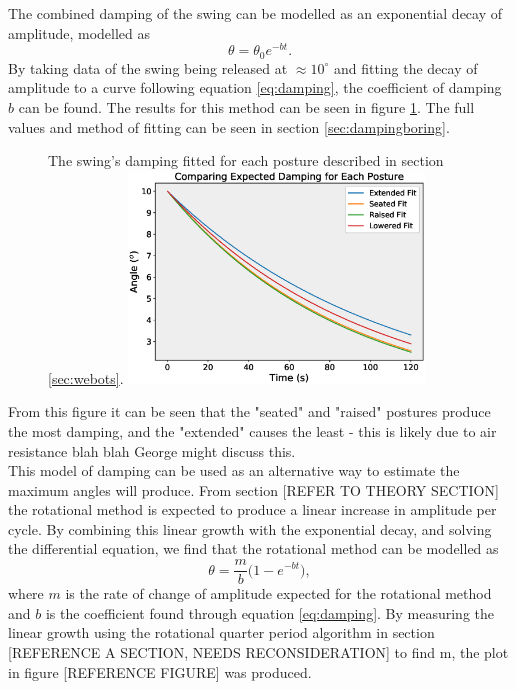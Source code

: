 \documentclass[11pt]{article}
\begin{document}
The combined damping of the swing can be modelled as an exponential decay of amplitude, modelled as 
\begin{equation} \label{eq:damping}
    \theta = \theta_0 e^{-bt}.
\end{equation}
By taking data of the swing being released at $\approx 10^\circ$ and fitting the decay of amplitude to a curve following equation \ref{eq:damping}, the coefficient of damping $b$ can be found. The results for this method can be seen in figure \ref{fig:dampingpositions}. The full values and method of fitting can be seen in section \ref{sec:dampingboring}.

    \begin{figure}[]
        \centering
        \captionbox
             {The swing's damping fitted for each posture described in section \ref{sec:webots}.\label{fig:dampingpositions}}
             {\includegraphics[width=0.7\textwidth]{DampingComparison.eps}}
    \end{figure}
 
From this figure it can be seen that the "seated" and "raised" postures produce the most damping, and the "extended" causes the least - this is likely due to air resistance blah blah George might discuss this.\\

This model of damping can be used as an alternative way to estimate the maximum angles will produce. From section [REFER TO THEORY SECTION] the rotational method is expected to produce a linear increase in amplitude per cycle. By combining this linear growth with the exponential decay, and solving the differential equation, we find that the rotational method can be modelled as
\begin{equation}
    \theta = \frac{m}{b}\big(1-e^{-bt}\big),
\end{equation}
where $m$ is the rate of change of amplitude expected for the rotational method and $b$ is the coefficient found through equation \ref{eq:damping}. By measuring the linear growth using the rotational quarter period algorithm in section [REFERENCE A SECTION, NEEDS RECONSIDERATION] to find m, the plot in figure [REFERENCE FIGURE] was produced.\\
\end{document}
